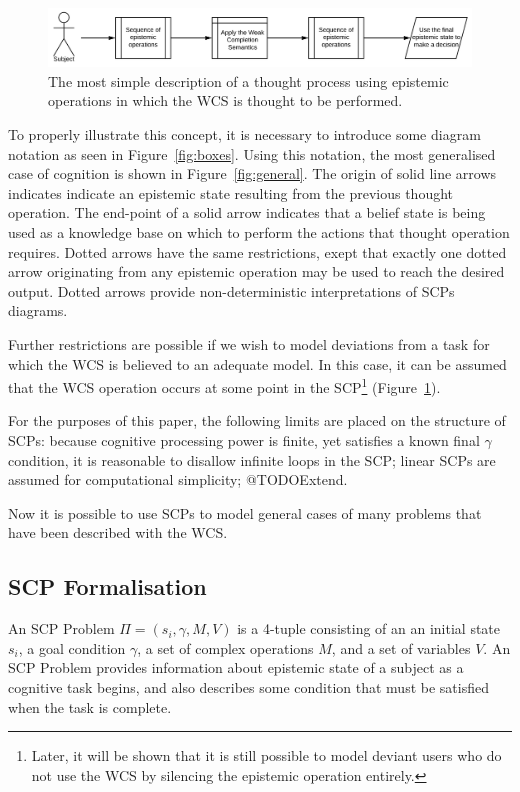 \documentclass{article}
\begin{document}
\begin{figure}
\centering \includegraphics[scale=.65]{generalwcs}
\caption{The most simple description of a thought process using epistemic operations in which the WCS is thought to be performed.}
\label{fig:generalWCS}
\end{figure}


To properly illustrate this concept, it is necessary to introduce some diagram notation as seen in Figure~\ref{fig:boxes}. Using this notation, the most generalised case of cognition is shown in Figure~\ref{fig:general}. The origin of solid line arrows indicates indicate an epistemic state resulting from the previous thought operation. The end-point of a solid arrow indicates that a belief state is being used as a knowledge base on which to perform the actions that thought operation requires. Dotted arrows have the same restrictions, exept that exactly one dotted arrow originating from any epistemic operation may be used to reach the desired output. Dotted arrows provide non-deterministic interpretations of SCPs diagrams.

Further restrictions are possible if we wish to model deviations from a task for which the WCS is believed to an adequate model. In this case, it can be assumed that the WCS operation occurs at some point in the SCP\footnote{Later, it will be shown that it is still possible to model deviant users who do not use the WCS by silencing the epistemic operation entirely.} (Figure~\ref{fig:generalWCS}).

For the purposes of this paper, the following limits are placed on the structure of SCPs: because cognitive processing power is finite, yet satisfies a known final $\gamma$ condition, it is reasonable to disallow infinite loops in the SCP; linear SCPs are assumed for computational simplicity; @TODOExtend.

Now it is possible to use SCPs to model general cases of many problems that have been described with the WCS.

\subsection{SCP Formalisation}

An SCP Problem $\Pi = (s_i, \gamma, M, V)$ is a 4-tuple consisting of an an initial state $s_i$, a goal condition $\gamma$, a set of complex operations $M$, and a set of variables $V$. An SCP Problem provides information about epistemic state of a subject as a cognitive task begins, and also describes some condition that must be satisfied when the task is complete.
\end{document}
